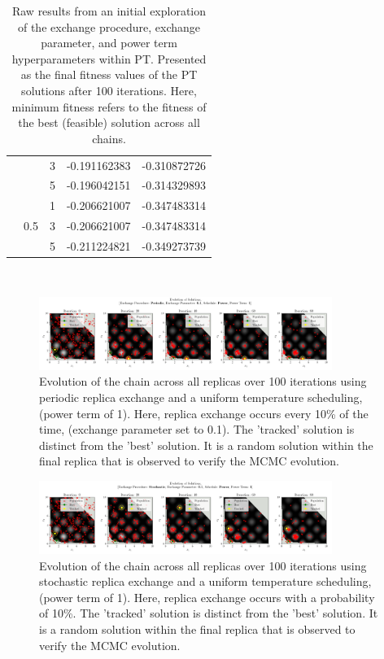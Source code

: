 \documentclass[10pt]{article}
\begin{document}
\begin{table}[H]
\begin{tabular}{|*{5}{c|}}
        & & 3\cellcolor{lightgray} & -0.191162383\cellcolor{lightgray} & -0.310872726\cellcolor{lightgray} \\
        & & 5\cellcolor{gray} & -0.196042151\cellcolor{gray} & -0.314329893\cellcolor{gray} \\
        \cline{2-5}
        & \multirow{3}{*}{0.5} & 1 & -0.206621007 & -0.347483314 \\
        & & 3\cellcolor{lightgray} & -0.206621007\cellcolor{lightgray} & -0.347483314\cellcolor{lightgray} \\
        & & 5\cellcolor{gray} & -0.211224821\cellcolor{gray} & -0.349273739\cellcolor{gray} \\
        \hline
    \end{tabular}\
    \captionsetup{justification=centering}
    \caption{Raw results from an initial exploration of the exchange procedure, exchange parameter, and power term hyperparameters within PT. Presented as the final fitness values of the PT solutions after 100 iterations. Here, minimum fitness refers to the fitness of the best (feasible) solution across all chains.}
    \label{tab:exchange_results}
\end{table}

\begin{figure}[H]
    \centering
    \includegraphics[width=0.85\textwidth]{../figures/KBF/100_iters/Periodic/Power/0.1_1_Solutions.png}
    \captionsetup{justification=centering}
    \caption{Evolution of the chain across all replicas over 100 iterations using periodic replica exchange and a uniform temperature scheduling, (power term of 1). Here, replica exchange occurs every 10\% of the time, (exchange parameter set to 0.1). The 'tracked' solution is distinct from the 'best' solution. It is a random solution within the final replica that is observed to verify the MCMC evolution.}
    \label{fig:PeriodicApp}
\end{figure}

\begin{figure}[H]
    \centering
    \includegraphics[width=0.85\textwidth]{../figures/KBF/100_iters/Stochastic/Power/0.1_1_Solutions.png}
    \captionsetup{justification=centering}
    \caption{Evolution of the chain across all replicas over 100 iterations using stochastic replica exchange and a uniform temperature scheduling, (power term of 1). Here, replica exchange occurs with a probability of 10\%.  The 'tracked' solution is distinct from the 'best' solution. It is a random solution within the final replica that is observed to verify the MCMC evolution.}
    \label{fig:StochasticApp}
\end{figure}
\end{document}
